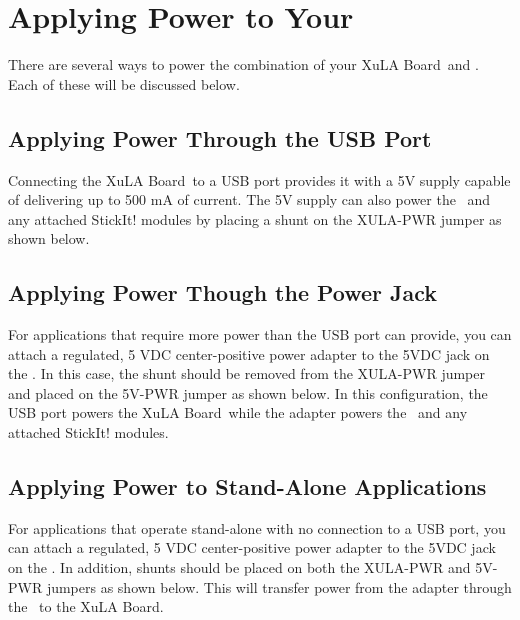 \documentclass[letterpaper,11pt,oneside]{memoir}
\newcommand{\xula}{XuLA Board}
\begin{document}
\section{Applying Power to Your \texorpdfstring{\product}{StickIt! Board}}

There are several ways to power the combination of your \xula\ and \product.
Each of these will be discussed below.

\subsection{Applying Power Through the USB Port}

Connecting the \xula\ to a USB port provides it with a 5V supply capable of
delivering up to 500 mA of current.
The 5V supply can also power the \product\ and any attached StickIt! modules by 
placing a shunt on the XULA-PWR jumper as shown below.


\pagebreak %

\subsection{Applying Power Though the Power Jack}

For applications that require more power than the USB port can provide, you can
attach a regulated, 5 VDC center-positive power adapter to the 5VDC jack on the
\product. 
In this case, the shunt should be removed from the XULA-PWR
jumper and placed on the 5V-PWR jumper as shown below. 
In this configuration, the USB port powers the \xula\ while the adapter powers
the \product\ and any attached StickIt! modules.


\pagebreak %

\subsection{Applying Power to Stand-Alone Applications}

For applications that operate stand-alone with no connection to a USB port, you
can attach a regulated, 5 VDC center-positive power adapter to the 5VDC jack on
the \product. 
In addition, shunts should be placed on both the XULA-PWR
and 5V-PWR jumpers as shown below. 
This will transfer power from the adapter through the \product\ to the \xula.
\end{document}
